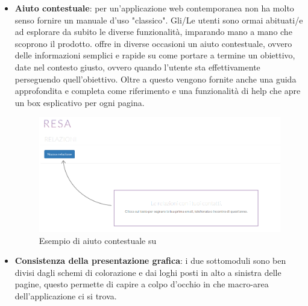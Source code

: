 \begin{itemize}
\item \textbf{Aiuto contestuale}: per un'applicazione web contemporanea non ha molto senso
fornire un manuale d'uso "classico". Gli/Le utenti sono ormai abituati/e ad esplorare da
subito le diverse funzionalità, imparando mano a mano che scoprono il prodotto.
\fiscoloWeb{} offre in diverse occasioni un aiuto contestuale, ovvero delle informazioni
semplici e rapide su come portare a termine un obiettivo, date nel contesto giusto, ovvero
quando l'utente sta effettivamente perseguendo quell'obiettivo. Oltre a questo vengono
fornite anche una guida approfondita e completa come riferimento e una funzionalità di help
che apre un box esplicativo per ogni pagina.

\begin{figure}[H]\label{imgAiutoContestuale}
\centering
\includegraphics[width=1\columnwidth]{images/aiutoContestuale.png}
\caption{Esempio di aiuto contestuale su \resa}
\end{figure}

\item \textbf{Consistenza della presentazione grafica}: i due sottomoduli sono ben divisi
dagli schemi di colorazione e dai loghi posti in alto a sinistra delle pagine, questo permette
di capire a colpo d'occhio in che macro-area dell'applicazione ci si trova.
\end{itemize}